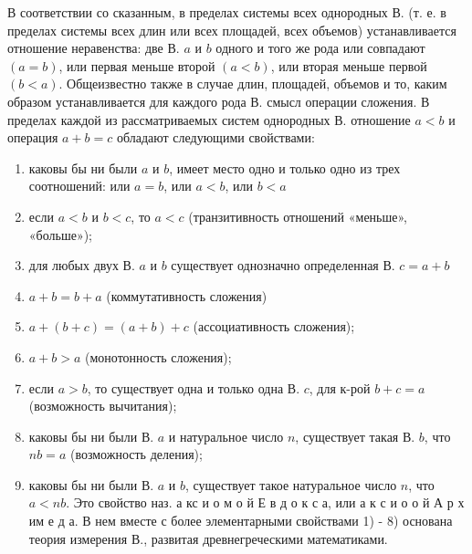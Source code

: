 \documentclass[10pt]{article}
\begin{document}
В соответствии со сказанным, в пределах системы всех однородных В. (т. е. в пределах системы всех длин или всех площадей, всех объемов) устанавливается отношение неравенства: две В. $a$ и $b$ одного и того же рода или совпадают $(a=b)$, или первая меньше второй $(a<b)$, или вторая меньше первой $(b<a)$. Общеизвестно также в случае длин, площадей, объемов и то, каким образом устанавливается для каждого рода В. смысл операции сложения. В пределах каждой из рассматриваемых систем однородных В. отношение $a<b$ и операция $a+b=c$ обладают следующими свойствами:



\begin{enumerate}

  \item каковы бы ни были $a$ и $b$, имеет место одно и только одно из трех соотношений: или $a=b$, или $a<b$, или $b<a$



  \item если $a<b$ и $b<c$, то $a<c$ (транзитивность отношений «меньше», «больше»);



  \item для любых двух В. $a$ и $b$ существует однозначно определенная В. $c=a+b$



  \item $a+b=b+a$ (коммутативность сложения)



  \item $a+(b+c)=(a+b)+c$ (ассоциативность сложения);



  \item $a+b>a$ (монотонность сложения);



  \item если $a>b$, то существует одна и только одна В. $c$, для к-рой $b+c=a$ (возможность вычитания);



  \item каковы бы ни были В. $a$ и натуральное число $n$, существует такая В. $b$, что $n b=a$ (возможность деления);



  \item каковы бы ни были В. $a$ и $b$, существует такое натуральное число $n$, что $a<n b$. Это свойство наз. а кс и о м о й Е в д о к с а, или а к с и о о й А р х им е д а. В нем вместе с более элементарными свойствами 1) - 8) основана теория измерения В., развитая древнегреческими математиками.



\end{enumerate}
\end{document}
